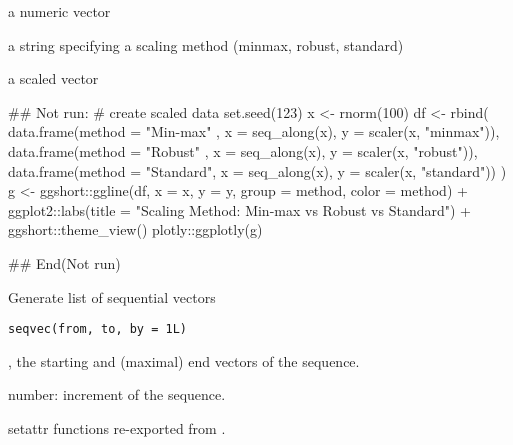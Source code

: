 \documentclass[letterpaper]{book}
\begin{document}
%
\begin{Arguments}
\begin{ldescription}
\item[\code{x}] a numeric vector

\item[\code{method}] a string specifying a scaling method (minmax, robust, standard)
\end{ldescription}
\end{Arguments}
%
\begin{Value}
a scaled vector
\end{Value}
%
\begin{Examples}
\begin{ExampleCode}
## Not run: 
# create scaled data
set.seed(123)
x <- rnorm(100)
df <- rbind(
  data.frame(method = "Min-max" , x = seq_along(x), y = scaler(x, "minmax")),
  data.frame(method = "Robust"  , x = seq_along(x), y = scaler(x, "robust")),
  data.frame(method = "Standard", x = seq_along(x), y = scaler(x, "standard"))
)
g <- ggshort::ggline(df, x = x, y = y, group = method, color = method) +
  ggplot2::labs(title = "Scaling Method: Min-max vs Robust vs Standard") +
  ggshort::theme_view()
plotly::ggplotly(g)

## End(Not run)

\end{ExampleCode}
\end{Examples}
%
\begin{Description}
Generate list of sequential vectors
\end{Description}
%
\begin{Usage}
\begin{verbatim}
seqvec(from, to, by = 1L)
\end{verbatim}
\end{Usage}
%
\begin{Arguments}
\begin{ldescription}
\item[\code{from}, \code{to}] the starting and (maximal) end vectors of the sequence.

\item[\code{by}] number: increment of the sequence.
\end{ldescription}
\end{Arguments}
%
\begin{Description}
setattr functions re-exported from .
\end{Description}
\end{document}
